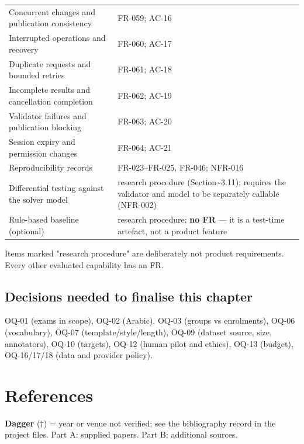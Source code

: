 \documentclass[
  11pt,a4paper,oneside]{report}
\begin{document}
\begin{longtable}[]{@{}p{\dimexpr(\linewidth-4\tabcolsep)/2\relax}p{\dimexpr(\linewidth-4\tabcolsep)/2\relax}@{}}
Concurrent changes and publication consistency & FR-059; AC-16 \\
Interrupted operations and recovery & FR-060; AC-17 \\
Duplicate requests and bounded retries & FR-061; AC-18 \\
Incomplete results and cancellation completion & FR-062; AC-19 \\
Validator failures and publication blocking & FR-063; AC-20 \\
Session expiry and permission changes & FR-064; AC-21 \\
Reproducibility records & FR-023--FR-025, FR-046; NFR-016 \\
Differential testing against the solver model & research procedure
(Section\textasciitilde3.11); requires the validator and model to be
separately callable (NFR-002) \\
Rule-based baseline (optional) & research procedure; \textbf{no FR} ---
it is a test-time artefact, not a product feature \\
\end{longtable}

Items marked "research procedure" are deliberately not product
requirements. Every other evaluated capability has an FR.

\hypertarget{decisions-needed-to-finalise-this-chapter}{%
\section{Decisions needed to finalise this
chapter}\label{decisions-needed-to-finalise-this-chapter}}

OQ-01 (exams in scope), OQ-02 (Arabic), OQ-03 (groups vs enrolments),
OQ-06 (vocabulary), OQ-07 (template/style/length), OQ-09 (dataset
source, size, annotators), OQ-10 (targets), OQ-12 (human pilot and
ethics), OQ-13 (budget), OQ-16/17/18 (data and provider policy).

\chapter*{References}
\small
\textbf{Dagger} ($\dagger$) = year or venue not verified; see the bibliography record in the project files. Part A: supplied papers. Part B: additional sources.
\end{document}
